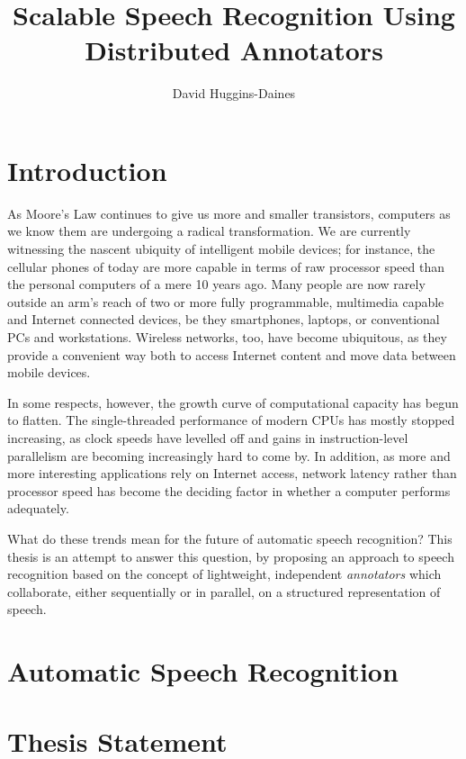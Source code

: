 \documentclass{article}
\title{Scalable Speech Recognition Using Distributed Annotators}
\author{David Huggins-Daines}
\begin{document}
\maketitle

\begin{abstract}


\end{abstract}

\tableofcontents{}

\section{Introduction}
\label{sec:intro}

As Moore's Law continues to give us more and smaller transistors,
computers as we know them are undergoing a radical transformation.  We
are currently witnessing the nascent ubiquity of intelligent mobile
devices; for instance, the cellular phones of today are more capable
in terms of raw processor speed than the personal computers of a mere
10 years ago.  Many people are now rarely outside an arm's reach of
two or more fully programmable, multimedia capable and Internet
connected devices, be they smartphones, laptops, or conventional PCs
and workstations.  Wireless networks, too, have become ubiquitous, as
they provide a convenient way both to access Internet content and move
data between mobile devices.

In some respects, however, the growth curve of computational capacity
has begun to flatten.  The single-threaded performance of modern CPUs
has mostly stopped increasing, as clock speeds have levelled off and
gains in instruction-level parallelism are becoming increasingly hard
to come by.  In addition, as more and more interesting applications
rely on Internet access, network latency rather than processor speed
has become the deciding factor in whether a computer performs
adequately.

What do these trends mean for the future of automatic speech
recognition?  This thesis is an attempt to answer this question, by
proposing an approach to speech recognition based on the concept of
lightweight, independent {\em annotators} which collaborate, either
sequentially or in parallel, on a structured representation of speech.

\section{Automatic Speech Recognition}
\label{sec:asr}

\section{Thesis Statement}
\label{sec:thesis}






\end{document}
